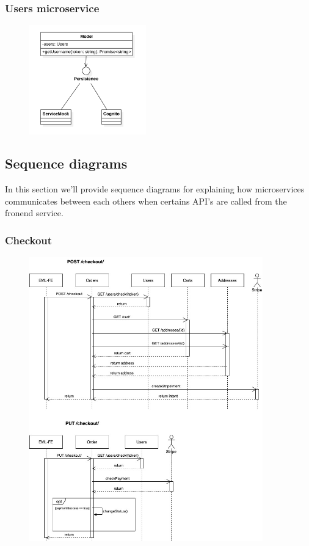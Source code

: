 \subsubsection{Users microservice}
\begin{figure}[H]
    \includegraphics[width=0.45\textwidth]{res/images/class-diagrams/users.png}
\end{figure}

\subsection{Sequence diagrams}
In this section we'll provide sequence diagrams for explaining how microservices communicates between each others
when certains API's are called from the fronend service.

\subsubsection{Checkout}
\begin{figure}[H]
    \includegraphics[width=0.9\textwidth]{res/images/sequence-diagrams/checkout.jpg}
\end{figure}

